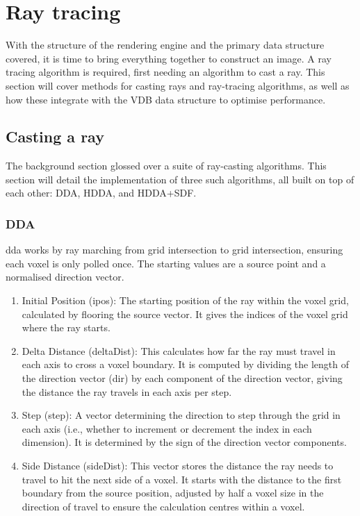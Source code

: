 
\section{Ray tracing}
With the structure of the rendering engine and the primary data structure covered, it is time to bring everything together to construct an image.
A ray tracing algorithm is required, first needing an algorithm to cast a ray.
This section will cover methods for casting rays and ray-tracing algorithms, as well as how these integrate with the VDB data structure to optimise performance.

\subsection{Casting a ray}
The background section glossed over a suite of ray-casting algorithms.
This section will detail the implementation of three such algorithms, all built on top of each other: DDA, HDDA, and HDDA+SDF.

\subsubsection{DDA}
\acrshort{dda} works by ray marching from grid intersection to grid intersection, ensuring each voxel is only polled once.
The starting values are a source point and a normalised direction vector.
\begin{enumerate}
  \item Initial Position (ipos): The starting position of the ray within the voxel grid, calculated by flooring the source vector. It gives the indices of the voxel grid where the ray starts.
  \item Delta Distance (deltaDist): This calculates how far the ray must travel in each axis to cross a voxel boundary. It is computed by dividing the length of the direction vector (dir) by each component of the direction vector, giving the distance the ray travels in each axis per step.
  \item Step (step): A vector determining the direction to step through the grid in each axis (i.e., whether to increment or decrement the index in each dimension). It is determined by the sign of the direction vector components.
  \item Side Distance (sideDist): This vector stores the distance the ray needs to travel to hit the next side of a voxel. It starts with the distance to the first boundary from the source position, adjusted by half a voxel size in the direction of travel to ensure the calculation centres within a voxel.
\end{enumerate}

